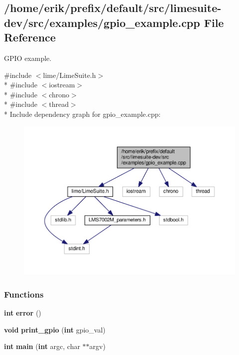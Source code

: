 \subsection{/home/erik/prefix/default/src/limesuite-\/dev/src/examples/gpio\+\_\+example.cpp File Reference}
\label{gpio__example_8cpp}


G\+P\+IO example.  


{\ttfamily \#include $<$lime/\+Lime\+Suite.\+h$>$}\\*
{\ttfamily \#include $<$iostream$>$}\\*
{\ttfamily \#include $<$chrono$>$}\\*
{\ttfamily \#include $<$thread$>$}\\*
Include dependency graph for gpio\+\_\+example.\+cpp\+:
\nopagebreak
\begin{figure}[H]
\begin{center}
\leavevmode
\includegraphics[width=350pt]{db/d03/gpio__example_8cpp__incl}
\end{center}
\end{figure}
\subsubsection*{Functions}
\begin{DoxyCompactItemize}
\item 
{\bf int} {\bf error} ()
\item 
{\bf void} {\bf print\+\_\+gpio} ({\bf int} gpio\+\_\+val)
\item 
{\bf int} {\bf main} ({\bf int} argc, char $\ast$$\ast$argv)
\end{DoxyCompactItemize}
